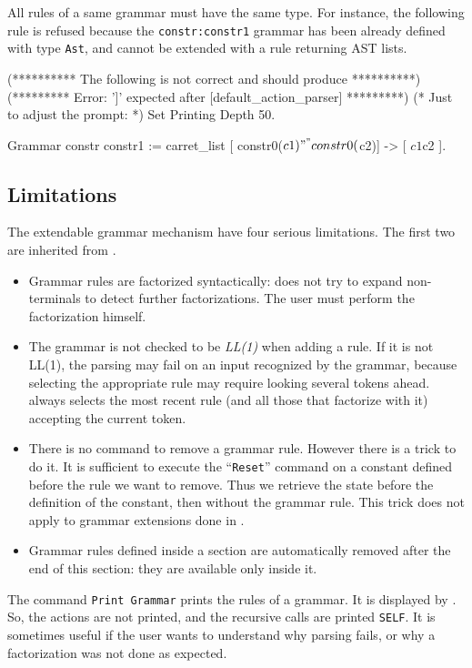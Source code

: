 All rules of a same grammar must have the same type. For instance, the
following rule is refused because the \verb+constr:constr1+ grammar
has been already defined with type {\tt Ast}, and cannot be extended
with a rule returning AST lists.

\begin{coq_eval}
(********** The following is not correct and should produce **********)
(********* Error: ']' expected after [default_action_parser] *********)
(* Just to adjust the prompt: *) Set Printing Depth 50.
\end{coq_eval}
\begin{coq_example}           
Grammar constr constr1 :=
  carret_list [ constr0($c1) "^" constr0($c2)] -> [ $c1 $c2 ].
\end{coq_example}


\subsection{Limitations}

The extendable grammar mechanism have four serious limitations. The
first two are inherited from {\camlpppp}.
\begin{itemize}
\item Grammar rules are factorized syntactically: {\camlpppp} does not
  try to expand non-terminals to detect further factorizations. The
  user must perform the factorization himself.
\item The grammar is not checked to be \emph{LL(1)} when
  adding a rule.  If it is not LL(1), the parsing may fail on an input
  recognized by the grammar, because selecting the appropriate rule
  may require looking several tokens ahead. {\camlpppp} always selects
  the most recent rule (and all those that factorize with it)
  accepting the current token.
\item There is no command to remove a grammar rule. However there is a
  trick to do it. It is sufficient to execute the ``{\tt Reset}''
  command on a constant defined before the rule we want to remove.
  Thus we retrieve the state before the definition of the constant,
  then without the grammar rule. This trick does not apply to grammar
  extensions done in {\ocaml}.
\item Grammar rules defined inside a section are automatically removed
  after the end of this section: they are available only inside it.
\end{itemize}

The command {\tt Print Grammar} prints the rules of a grammar. It is
displayed by {\camlpppp}. So, the actions are not printed, and the
recursive calls are printed \verb+SELF+. It is
sometimes useful if the user wants to understand why parsing fails, or
why a factorization was not done as expected.

